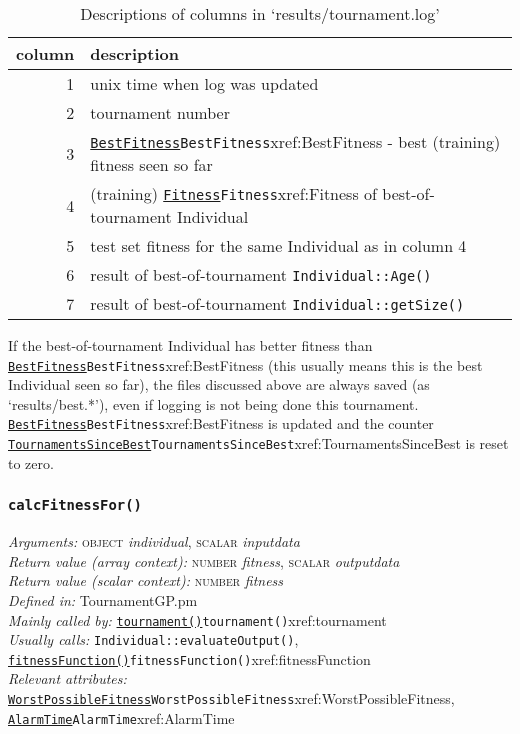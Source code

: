\documentclass[a4paper]{article}
\begin{document}
\begin{table}
\caption{Descriptions of columns in `results/tournament.log'\label{tab:tournlog}}
\begin{center}
\begin{tabular}{rl}
\hline
column & description \\
\hline
1 & unix time when log was updated\\
2 & tournament number\\
3 & \hyperref[no]{\texttt{BestFitness}}{\texttt{BestFitness}}{xref:BestFitness} - best (training) fitness seen so far\\
4 & (training) \hyperref[no]{\texttt{Fitness}}{\texttt{Fitness}}{xref:Fitness} of best-of-tournament Individual\\
5 & test set fitness for the same Individual as in column 4\\
6 & result of best-of-tournament \texttt{Individual::Age()}\\
7 & result of best-of-tournament \texttt{Individual::getSize()}\\
\hline
\end{tabular}
\end{center}
\end{table}

If the best-of-tournament Individual has better fitness than
\hyperref[no]{\texttt{BestFitness}}{\texttt{BestFitness}}{xref:BestFitness} (this usually means this is the best Individual
seen so far), the files discussed above are always saved (as
`results/best.*'), even if logging is not being done this tournament.
\hyperref[no]{\texttt{BestFitness}}{\texttt{BestFitness}}{xref:BestFitness} is updated and the counter
\hyperref[no]{\texttt{TournamentsSinceBest}}{\texttt{TournamentsSinceBest}}{xref:TournamentsSinceBest} is reset to zero.



\subsubsection{\texttt{calcFitnessFor()}}\label{xref:calcFitnessFor}
\begin{flushleft}
\textit{Arguments:} \textsc{object} \textit{individual}, \textsc{scalar} \textit{inputdata} \\
\textit{Return value (array context):} \textsc{number} \textit{fitness}, \textsc{scalar} \textit{outputdata}\\
\textit{Return value (scalar context):} \textsc{number} \textit{fitness}\\
\textit{Defined in:} TournamentGP.pm\\
\textit{Mainly called by:} \hyperref[no]{\texttt{tournament()}}{\texttt{tournament()}}{xref:tournament}\\
\textit{Usually calls:} \texttt{Individual::evaluateOutput()}, \hyperref[no]{\texttt{fitnessFunction()}}{\texttt{fitnessFunction()}}{xref:fitnessFunction}\\
\textit{Relevant attributes:} \hyperref[no]{\texttt{WorstPossibleFitness}}{\texttt{WorstPossibleFitness}}{xref:WorstPossibleFitness}, \hyperref[no]{\texttt{AlarmTime}}{\texttt{AlarmTime}}{xref:AlarmTime}
\end{flushleft}
\end{document}
